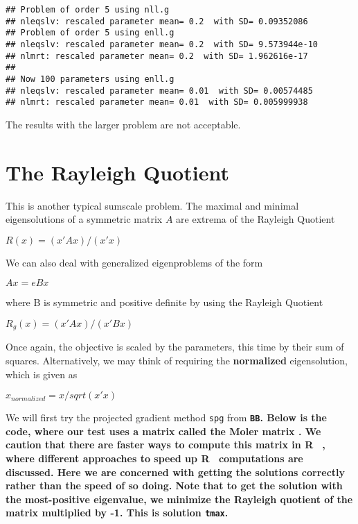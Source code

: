 \documentclass[11pt]{article}\usepackage[]{graphicx}\usepackage[]{color}
\makeatletter
\newenvironment{kframe}{%
 \def\at@end@of@kframe{}%
 \ifinner\ifhmode%
  \def\at@end@of@kframe{\end{minipage}}%
  \begin{minipage}{\columnwidth}%
 \fi\fi%
 \def\FrameCommand##1{\hskip\@totalleftmargin \hskip-\fboxsep
 \colorbox{shadecolor}{##1}\hskip-\fboxsep
     \hskip-\linewidth \hskip-\@totalleftmargin \hskip\columnwidth}%
 \MakeFramed {\advance\hsize-\width
   \@totalleftmargin\z@ \linewidth\hsize
   \@setminipage}}%
 {\par\unskip\endMakeFramed%
 \at@end@of@kframe}
\newenvironment{knitrout}{}{} %
\newcommand{\B}[1]{{\bf #1 \rm}}
\newcommand{\R}{{\sf R }}
\newcommand{\code}[1]{{\tt#1}}
\newcommand{\pkg}[1]{\bf{\tt#1}\rm }
\makeatother
\begin{document}
\begin{knitrout}\scriptsize
{}\color{fgcolor}\begin{kframe}
\begin{verbatim}
## Problem of order 5 using nll.g
## nleqslv: rescaled parameter mean= 0.2  with SD= 0.09352086
## Problem of order 5 using enll.g
## nleqslv: rescaled parameter mean= 0.2  with SD= 9.573944e-10
## nlmrt: rescaled parameter mean= 0.2  with SD= 1.962616e-17
## 
## Now 100 parameters using enll.g
## nleqslv: rescaled parameter mean= 0.01  with SD= 0.00574485
## nlmrt: rescaled parameter mean= 0.01  with SD= 0.005999938
\end{verbatim}
\end{kframe}
\end{knitrout}

The results with the larger problem are not acceptable. 

\section{The Rayleigh Quotient}

This is another typical sumscale problem. 
The maximal and minimal eigensolutions of a symmetric matrix $A$ 
are extrema of the Rayleigh Quotient

$ R(x) =  (x' A x)  / (x' x) $

We can also deal with generalized eigenproblems of the form 

$A x = e B x$

where B is symmetric and positive definite by using the Rayleigh Quotient

$ R_g(x) =  (x' A x)  / (x' B x) $

Once again, the objective is scaled by the parameters, this time by their 
sum of squares. Alternatively, 
we may think of requiring the \B{normalized} eigensolution, which is given as 

$ x_{normalized} = x/sqrt(x' x) $

We will first try the projected gradient method \code{spg} from \pkg{BB}. 
Below is the code, where our test uses
a matrix called the Moler matrix \cite[Appendix 1]{cnm79}. We caution that there
are faster ways to compute this matrix in \R\, \citep{RQtimes12}, where different
approaches to speed up \R\ computations are discussed. Here we are concerned 
with getting the solutions correctly rather than the speed of so doing. Note
that to get the solution with the most-positive eigenvalue, we minimize the
Rayleigh quotient of the matrix multiplied by -1. This is solution \code{tmax}.
\end{document}
